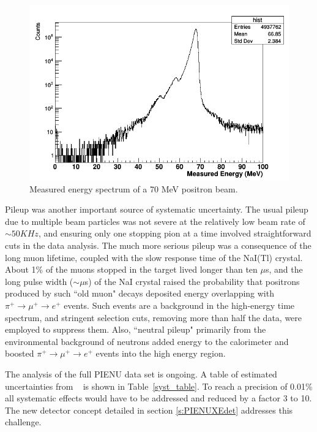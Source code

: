 \begin{figure}[h!]
\centering
\includegraphics[scale=0.3]{sections/figures/0degrees_BINACsI.png}
\caption{Measured energy spectrum of a 70 MeV positron beam.}
\label{fig:0degrees_data}
\end{figure}

Pileup was another important source of systematic uncertainty. The usual pileup due to multiple beam particles was not severe at the relatively low beam rate of $\sim 50KHz$, and ensuring only one stopping pion at a time involved straightforward cuts in the data analysis. The much more serious pileup was a consequence of the long muon lifetime, coupled with the slow response time of the NaI(Tl) crystal. About 1\% of the muons stopped in the target lived longer than ten $\mu$s, and the long pulse width ($\sim\mu$s) of the NaI crystal raised the probability that positrons produced by such ``old muon" decays deposited energy overlapping with $\pi^+ \rightarrow \mu^+ \rightarrow e^+$ events. Such events are a background in the high-energy time spectrum, and stringent selection cuts, removing more than half the data, were employed to suppress them.  Also, ``neutral pileup" primarily from the environmental background of neutrons added energy to the calorimeter and boosted $\pi^+ \rightarrow \mu^+ \rightarrow e^+$ events into the high energy region.

The analysis of the full PIENU data set is  ongoing. A table of estimated uncertainties from  ~\cite{Aguilar-Arevalo3} is shown in Table~\ref{syst_table}.  To reach a precision of 0.01\%  all systematic effects would have to be addressed and reduced by a factor 3 to 10. The new detector concept detailed in section \ref{s:PIENUXEdet}
 addresses this challenge.  

